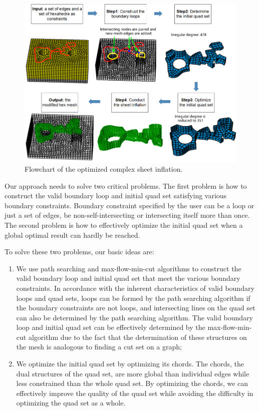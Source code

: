 \documentclass[final,5p,times,twocolumn]{elsarticle}
\begin{document}
\begin{figure}[htbp]
\begin{center}
\includegraphics[width=16cm]{figures/overview2.png}
\caption{Flowchart of the optimized complex sheet inflation.}
\label{fig:overview}
\end{center}
\end{figure}

Our approach needs to solve two critical problems. The first problem is how to construct the valid boundary loop and initial quad set satisfying various boundary constraints. Boundary constraint specified by the user can be a loop or just a set of edges, be non-self-intersecting or intersecting itself more than once. The second problem is how to effectively optimize the initial quad set when a global optimal result can hardly be reached.

To solve these two problems, our basic ideas are:
\begin{enumerate}
  \item We use path searching and max-flow-min-cut algorithms to construct the valid boundary loop and initial quad set that meet the various boundary constraints. In accordance with the inherent characteristics of valid boundary loops and quad sets, loops can be formed by the path searching algorithm if the boundary constraints are not loops, and intersecting lines on the quad set can also be determined by the path searching algorithm. The valid boundary loop and initial quad set can be effectively determined by the max-flow-min-cut algorithm due to the fact that the determination of these structures on the mesh is analogous to finding a cut set on a graph;
  \item We optimize the initial quad set by optimizing its chords. The chords, the dual structures of the quad set, are more global than individual edges while less constrained than the whole quad set. By optimizing the chords, we can effectively improve the quality of the quad set while avoiding the difficulty in optimizing the quad set as a whole.
\end{enumerate}
\end{document}
